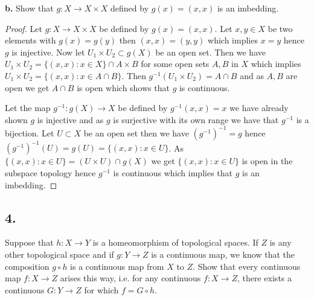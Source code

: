 \documentclass{amsart}
\theoremstyle{plain}
\theoremstyle{definition}
\theoremstyle{remark}
\begin{document}
\vspace{.1in}
{\bfseries b.} Show that $g : X \rightarrow X \times X$ defined by $g(x) = (x, x )$ is an imbedding. 

\begin{proof}
    Let $g:X \to X\times X$ be defined by $g(x)=(x,x)$. Let $x,y\in X$ be two elements with $g(x)=g(y)$ then $(x,x)=(y,y)$ which implies $x=y$ hence $g$ is injective. Now let $U_1 \times U_2 \subset g(X)$ be an open set. Then we have $U_1\times U_2=\{(x,x):x\in X\}\cap A\times B$ for some open sets $A,B$ in $X$ which implies $U_1\times U_2=\{(x,x): x\in A \cap B\}$. Then $g^{-1}(U_1\times U_2)=A\cap B$ and as $A,B$ are open we get $A\cap B$ is open which shows that $g$ is continuous.

    Let the map $g^{-1}:g(X)\to X$ be defined by $g^{-1}(x,x)=x$ we have already shown $g$ is injective and as $g$ is surjective with its own range we have that $g^{-1}$ is a bijection. Let $U\subset X$ be an open set then we have $(g^{-1})^{-1}=g$ hence $(g^{-1})^{-1}(U)=g(U)=\{(x,x):x\in U\}$. As $\{(x,x):x\in U\}=(U\times U) \cap g(X)$ we get $\{(x,x):x\in U\}$ is open in the subspace topology hence $g^{-1}$ is continuous which implies that $g$ is an imbedding.

\end{proof}


\vspace{.15in}

\noindent
\subsection*{4.} Suppose that $h : X \rightarrow Y$ is a homeomorphism of topological spaces. If $Z$ is any other topological space and if $g : Y \rightarrow Z$ is a continuous map, we know that the composition $g\circ h$ is a continuous map from $X$ to $Z$. Show that every continuous map $f : X \rightarrow Z$ arises this way, i.e. for any continuous $f : X \rightarrow Z$, there exists a continuous $G : Y \rightarrow Z$ for which $f = G \circ h$. 
\vspace{.15in}
\end{document}
